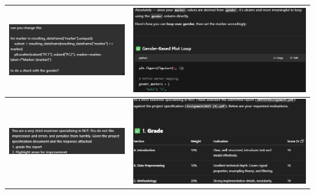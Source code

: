 \documentclass[conference]{IEEEtran}
\begin{document}
\begin{table}[htbp]
\begin{tabular}{|c|c|}
		\\
		\hline
		\includegraphics[width=0.5\linewidth]{img/img-chatgpt-prompt-3}
		&
		\includegraphics[width=0.5\linewidth]{img/img-chatgpt-reply-3}
		\\
		\hline
		\includegraphics[width=0.5\linewidth]{img/img-chatgpt-prompt-4}
		&
		\includegraphics[width=0.5\linewidth]{img/img-chatgpt-reply-4}
		\\
		\hline
		\end{tabular}
	\end{table}
		
	
	\printbibliography
	
\end{document}
